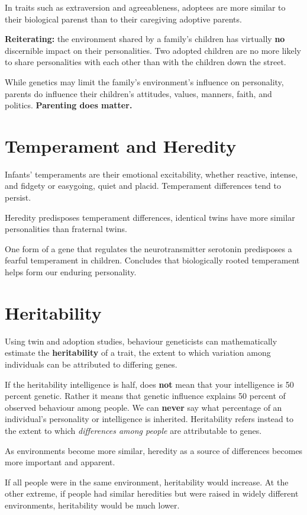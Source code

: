 In traits such as extraversion and agreeableness, adoptees are more similar to their biological parenst than to their caregiving adoptive parents. 

\textbf{Reiterating:} the environment shared by a family's children has virtually \textbf{no} discernible impact on their personalities. Two adopted children are no more likely to share personalities with each other than with the children down the street.

While genetics may limit the family's environment's influence on personality, parents do influence their children's attitudes, values, manners, faith, and politics. \textbf{Parenting does matter.}

\section*{Temperament and Heredity}
Infants' temperaments are their emotional excitability, whether reactive, intense, and fidgety or easygoing, quiet and placid. Temperament differences tend to persist. 

Heredity predisposes temperament differences, identical twins have more similar personalities than fraternal twins.

One form of a gene that regulates the neurotransmitter serotonin predisposes a fearful temperament in children. Concludes that biologically rooted temperament helps form our enduring personality. 

\section*{Heritability}
Using twin and adoption studies, behaviour geneticists can mathematically estimate the \textbf{heritability} of a trait, the extent to which variation among individuals can be attributed to differing genes. 

If the heritability intelligence is half, does \textbf{not} mean that your intelligence is 50 percent genetic. Rather it means that genetic influence explains 50 percent of observed behaviour among people. We can \textbf{never} say what percentage of an individual's personality or intelligence is inherited. Heritability refers instead to the extent to which \textit{differences among people} are attributable to genes.

As environments become more similar, heredity as a source of differences becomes more important and apparent. 

If all people were in the same environment, heritability would increase. At the other extreme, if people had similar heredities but were raised in widely different environments, heritability would be much lower.

